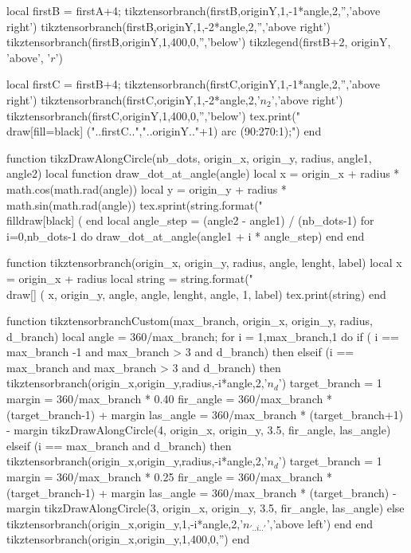 \begin{luacode*}
	 local firstB = firstA+4;
	 tikztensorbranch(firstB,originY,1,-1*angle,2,'','above right')
	 tikztensorbranch(firstB,originY,1,-2*angle,2,'','above right')
	 tikztensorbranch(firstB,originY,1,400,0,'','below')
	 tikzlegend(firstB+2, originY, 'above', '$r$')

	 local firstC = firstB+4;
	 tikztensorbranch(firstC,originY,1,-1*angle,2,'','above right')
	 tikztensorbranch(firstC,originY,1,-2*angle,2,'$n_{2}$','above right')
	 tikztensorbranch(firstC,originY,1,400,0,'','below')
	 tex.print("\\draw[fill=black] ("..firstC..","..originY.."+1) arc (90:270:1);")
end

function tikzDrawAlongCircle(nb_dots, origin_x, origin_y, radius, angle1, angle2)
	 local function draw_dot_at_angle(angle)
      local x = origin_x + radius * math.cos(math.rad(angle))
      local y = origin_y + radius * math.sin(math.rad(angle))
      tex.sprint(string.format("\\filldraw[black] (%
	 end
	 local angle_step = (angle2 - angle1) / (nb_dots-1)
	 for i=0,nb_dots-1 do
      draw_dot_at_angle(angle1 + i * angle_step)
	 end
end

function tikztensorbranch(origin_x, origin_y, radius, angle, lenght, label)
	 local x = origin_x + radius
	 local string = string.format("\\draw[] (%
																x, origin_y, angle, angle, lenght, angle, 1, label)
	 tex.print(string)
end

function tikztensorbranchCustom(max_branch, origin_x, origin_y, radius, d_branch)
	 local angle = 360/max_branch;
	 for i = 1,max_branch,1 do
			if ( i == max_branch -1 and max_branch > 3 and d_branch) then
			elseif (i == max_branch and max_branch > 3 and d_branch)  then
				 tikztensorbranch(origin_x,origin_y,radius,-i*angle,2,'$n_{d}$')
				 target_branch = 1
				 margin = 360/max_branch * 0.40
				 fir_angle = 360/max_branch * (target_branch-1) + margin
				 las_angle = 360/max_branch * (target_branch+1) - margin          
				 tikzDrawAlongCircle(4, origin_x, origin_y, 3.5, fir_angle, las_angle)
			elseif (i == max_branch and d_branch)  then
				 tikztensorbranch(origin_x,origin_y,radius,-i*angle,2,'$n_{d}$')
				 target_branch = 1
				 margin = 360/max_branch * 0.25
				 fir_angle = 360/max_branch * (target_branch-1) + margin
				 las_angle = 360/max_branch * (target_branch) - margin          
				 tikzDrawAlongCircle(3, origin_x, origin_y, 3.5, fir_angle, las_angle)
			else
				 tikztensorbranch(origin_x,origin_y,1,-i*angle,2,'$n_{'..i..'}$','above left')
			end
	 end
	 tikztensorbranch(origin_x,origin_y,1,400,0,'')
end


\end{luacode*}
